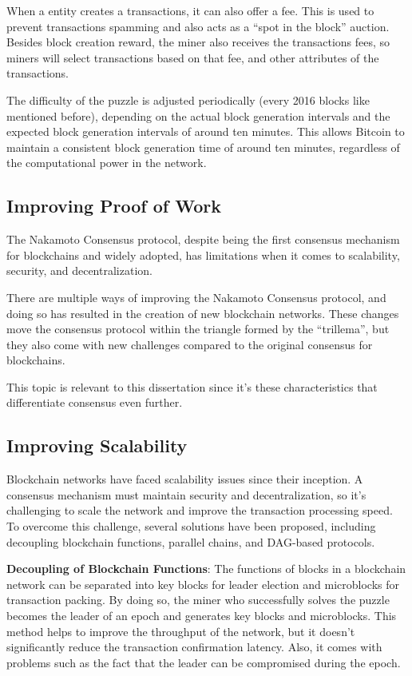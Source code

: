 When a entity creates a transactions, it can also offer a fee. This is used to prevent transactions spamming and also acts as a ``spot in the block'' auction.
Besides block creation reward, the miner also receives the transactions fees, so miners will select transactions based on that fee, and other attributes of the transactions.

The difficulty of the puzzle is adjusted periodically (every 2016 blocks like mentioned before), depending on the actual block generation intervals and the expected block generation intervals of around ten minutes. This allows Bitcoin to maintain a consistent block generation time of around ten minutes, regardless of the computational power in the network.

\subsection*{Improving Proof of Work}

The Nakamoto Consensus protocol, despite being the first consensus mechanism for block\-chains and widely adopted, has limitations when it comes to scalability, security, and decentralization.

There are multiple ways of improving the Nakamoto Consensus protocol, and doing so has resulted in the creation of new blockchain networks. These changes move the consensus protocol within the triangle formed by the ``trillema'', but they also come with new challenges compared to the original consensus for blockchains.

This topic is relevant to this dissertation since it's these characteristics that differentiate consensus even further.

\subsection*{Improving Scalability}
Blockchain networks have faced scalability issues since their inception. A consensus mechanism must maintain security and decentralization, so it's challenging to scale the network and improve the transaction processing speed. To overcome this challenge, several solutions have been proposed, including decoupling blockchain functions, parallel chains, and DAG-based protocols.

\textbf{Decoupling of Blockchain Functions}: The functions of blocks in a blockchain network can be separated into key blocks for leader election and microblocks for transaction packing. By doing so, the miner who successfully solves the puzzle becomes the leader of an epoch and generates key blocks and microblocks. This method helps to improve the throughput of the network, but it doesn't significantly reduce the transaction confirmation latency. Also, it comes with problems such as the fact that the leader can be compromised during the epoch.

